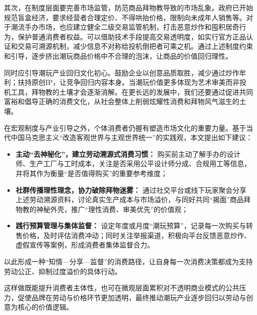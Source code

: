 其次，在制度层面要完善市场监管，防范商品拜物教导致的市场乱象。政府已开始规范盲盒经济，要求经营者合理定价、不得哄抬价格，限制向未成年人销售等\cite{ModernExpress2022BlindBoxRegulation}。对于潮流手办市场，也应建立健全二级交易监管机制，打击恶意炒作和囤积居奇行为，保护普通消费者权益。可以借助技术手段提高交易透明度，如实行官方正品认证和交易可溯源机制，减少信息不对称给投机倒把者可乘之机。通过上述制度约束和引导，逐步挤出潮玩商品价格中不合理的泡沫，让商品的价值回归理性。

同时应引导潮玩产业回归文化初心。鼓励企业以创意品质取胜，减少通过炒作牟利；扶持原创IP，让竞争回归内容本身。当潮玩价值更多体现为艺术审美而非投机工具，拜物教的土壤才会逐渐消解。在更长远的发展中，我们还要通过促进共同富裕和倡导正确的消费文化，从社会整体上削弱炫耀性消费和拜物风气滋生的土壤。

在宏观制度与产业引导之外，个体消费者仍握有塑造市场文化的重要力量。基于当代中国马克思主义“改造客观世界与主观世界统一”的实践观，本文提出如下建议：
\begin{itemize}
    \item \textbf{主动“去神秘化”，建立劳动溯源式消费习惯：} 
    购买前主动了解手办的设计师、生产工厂与工时成本，关注是否采用公平设计师分成、合规用工等信息，并将其作为衡量“是否值得购买”的重要参考维度；

    \item \textbf{社群传播理性理念，协力破除拜物迷雾：} 
    通过社交平台或线下玩家聚会分享上述劳动溯源资料，讨论真实生产成本与市场溢价，与同好共同“揭面”商品拜物教的神秘外壳，推广“理性消费、审美优先”的价值观；

    \item \textbf{践行预算管理与集体监督：} 
    设定年度或月度“潮玩预算”，记录每一次购买与转售价格，及时评估消费冲动；同时关注举报渠道，积极向平台反馈恶意炒作、虚假宣传等案例，形成消费者集体监督合力。 
\end{itemize}

以此形成一种“知情—分享—监督”的消费路径，让自身每一次消费决策都成为支持劳动公正、抑制过度溢价的具体行动。

这样做既能提升消费者主体性，也可在微观层面累积对不透明商业模式的公共压力，促使品牌在劳动与价格环节更加透明，最终推动潮玩产业逐步回归以劳动与创意为核心的价值逻辑。